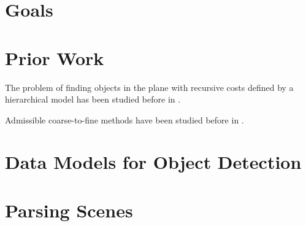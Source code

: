 \documentclass{book}
\begin{document}
  \section{Goals}
    \label{sec-detection-goals}
    

  \section{Prior Work}
    \label{sec-detection-priorwork}
    The problem of finding objects in the plane with recursive costs
    defined by a hierarchical model has been studied before in
    \cite{jin-geman, grammar-tr, pictorial}. 

    Admissible coarse-to-fine methods have been studied before in
    \cite{astar, cfdp}.

%     

    

  \section{Data Models for Object Detection}
    \label{sec-detection-datamodel}
    

  \section{Parsing Scenes}
    \label{sec-detection-scenes}
    


  

\end{document}
